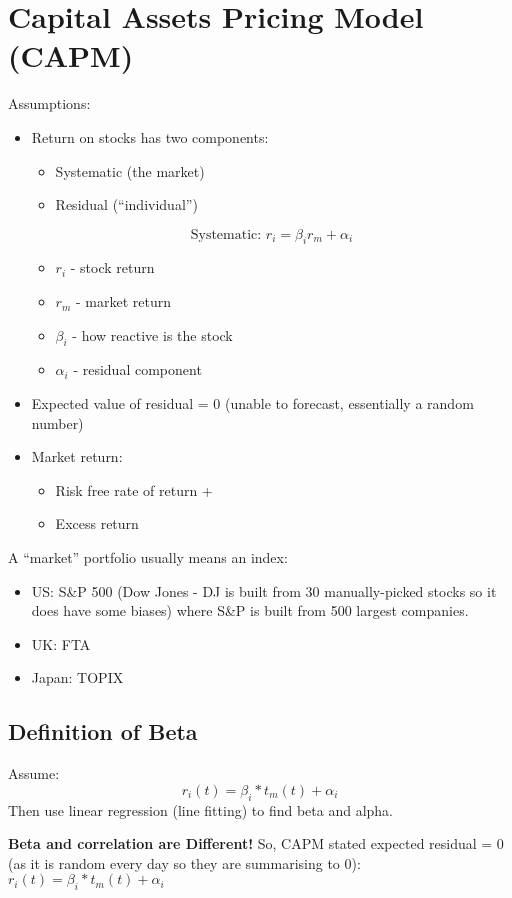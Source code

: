 \documentclass{scrartcl}
\begin{document}
\section{Capital Assets Pricing Model (CAPM)}
\label{sec:CAPM}
Assumptions:
\begin{itemize}
\item Return on stocks has two components:
  \begin{itemize}
  \item Systematic (the market)
  \item Residual (``individual'')
  \end{itemize}
$$\text{Systematic: } r_i = \beta_i r_m  + \alpha_i$$
\begin{itemize}
\item $r_i$ - stock return
\item $r_m$ - market return
\item $\beta_i$ - how reactive is the stock
\item $\alpha_i$ - residual component
\end{itemize}
\item Expected value of residual = 0 (unable to forecast, essentially a random
  number)
\item Market return:
  \begin{itemize}
  \item Risk free rate of return +
  \item Excess return
  \end{itemize}
\end{itemize}
A ``market'' portfolio usually means an index:
\begin{itemize}
\item US: S\&P 500 (Dow Jones - DJ is built from 30 manually-picked stocks so it
  does have some biases) where S\&P is built from 500 largest companies.
\item UK: FTA
\item Japan: TOPIX
\end{itemize}
\subsection{Definition of Beta}
\label{sec:Beta}
Assume:
$$r_i(t) = \beta_i * t_m(t) + \alpha_i$$
Then use linear regression (line fitting) to find beta and alpha.

{\bf Beta and correlation are Different!} So, CAPM stated expected residual = 0
(as it is random every day so they are summarising to 0): $r_i(t) = \beta_i *
t_m(t) + \alpha_i$
\end{document}
